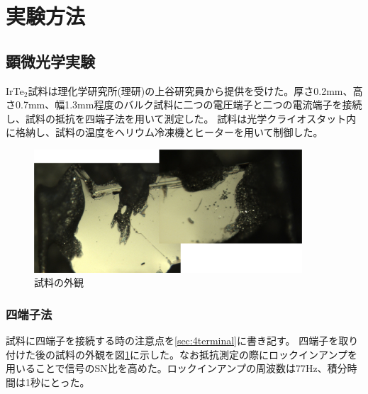 \section{実験方法}
\subsection{顕微光学実験}
IrTe$_2$試料は理化学研究所(理研)の上谷研究員から提供を受けた。厚さ0.2mm、高さ0.7mm、幅1.3mm程度のバルク試料に二つの電圧端子と二つの電流端子を接続し、試料の抵抗を四端子法を用いて測定した。
試料は光学クライオスタット内に格納し、試料の温度をヘリウム冷凍機とヒーターを用いて制御した。
\begin{figure}[htb]
  \begin{center}
   \includegraphics[width=100mm]{sample.eps}
  \end{center}
  \caption{試料の外観}
  \label{fig:sample}
\end{figure}

\subsubsection{四端子法}
試料に四端子を接続する時の注意点を\ref{sec:4terminal}に書き記す。 四端子を取り付けた後の試料の外観を図\ref{fig:sample}に示した。なお抵抗測定の際にロックインアンプを用いることで信号のSN比を高めた。ロックインアンプの周波数は77Hz、積分時間は1秒にとった。

